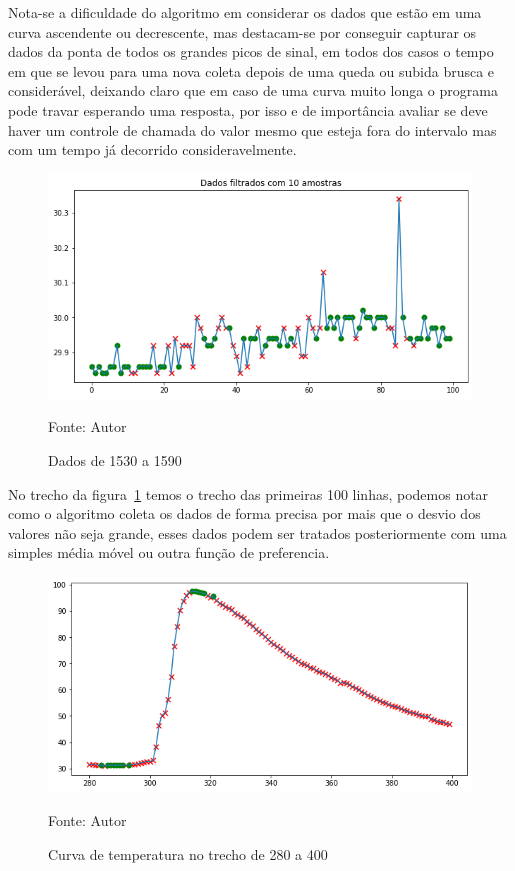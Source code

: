 Nota-se a dificuldade do algoritmo em considerar os dados que estão em uma curva ascendente ou decrescente, mas destacam-se por conseguir capturar os dados da ponta de todos os grandes picos de sinal, em todos dos casos o tempo em que se levou para uma nova coleta depois de uma queda ou subida brusca e considerável, deixando claro que em caso de uma curva muito longa o programa pode travar esperando uma resposta, por isso e de importância avaliar se deve haver um controle de chamada do valor mesmo que esteja fora do intervalo mas com um tempo já decorrido consideravelmente.


\begin{figure}[H]
	\centering
	\includegraphics[width=15cm]{imagens/sensores/filtrado_100_ultimas.png}
	\caption{Dados de 1530 a 1590}
	Fonte: Autor
	\label{fig: indice}
\end{figure}

No trecho da figura~\ref{fig: indice} temos o trecho das primeiras 100 linhas, podemos notar como o algoritmo coleta os dados de forma precisa por mais que o desvio dos valores não seja grande, esses dados podem ser tratados posteriormente com uma simples média móvel ou outra função de preferencia.


\begin{figure}[H]
	\centering
	\includegraphics[width=15cm]{imagens/sensores/indice2.png}
	\caption{Curva de temperatura no trecho de 280 a 400}
	Fonte: Autor
	\label{fig: indice2}
\end{figure}


